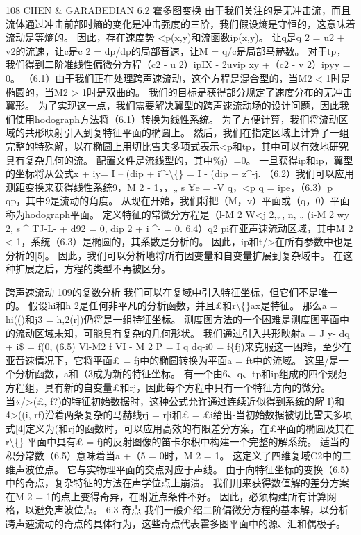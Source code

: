 \documentclass[UTF8,11pt,a4paper,openany,fontset=fandol]{ctexbook}
\begin{document}
108 CHEN \& GARABEDIAN 6.2 霍多图变换 由于我们关注的是无冲击流，而且流体通过冲击前部时熵的变化是冲击强度的三阶，我们假设熵是守恒的，这意味着流动是等熵的。 因此，存在速度势 <p(x,y)和流函数ip(x,y)。 让q是q 2 = u2 + v2的流速，让c是c 2 = dp/dp的局部音速，让M = q/c是局部马赫数。 对于tp，我们得到二阶准线性偏微分方程（c2 - u 2）ipIX - 2uvip xy +（c2 - v 2）ipyy = 0。 （6.1）由于我们正在处理跨声速流动，这个方程是混合型的，当M2 < 1时是椭圆的，当M2 > 1时是双曲的。 我们的目标是获得部分规定了速度分布的无冲击翼形。 为了实现这一点，我们需要解决翼型的跨声速流动场的设计问题，因此我们使用hodograph方法将（6.1）转换为线性系统。 为了方便计算，我们将流动区域的共形映射引入到复特征平面的椭圆上。 然后，我们在指定区域上计算了一组完整的特殊解，以在椭圆上用切比雪夫多项式表示<p和tp，其中可以有效地研究具有复杂几何的流。 配置文件是流线型的，其中\%j）=0。 一旦获得ip和ip，翼型的坐标将从公式x + iy= I -- (dip + i\textasciicircum{}-\textbackslash\{\} = I - (dip + z\textasciicircum{}-j. （6.2）我们可以应用测距变换来获得线性系统9，M 2 - 1，，„ s ¥e = -V q，<p q = ipe，（6.3）p qp，其中9是流动的角度。 从现在开始，我们将把（M，v）平面或（q，0）平面称为hodograph平面。 定义特征的常微分方程是（l-M 2 W<j 2,„, n, „ (i-M 2 wy 2, s \textasciicircum{} TJ-L- + d92 = 0, dip 2 + i \textasciicircum{}- = 0. 6.4）q2 pi在亚声速流动区域，其中M 2 < 1，系统（6.3）是椭圆的，其系数是分析的。 因此，ip和t/>在所有参数中也是分析的[5]。 因此，我们可以分析地将所有因变量和自变量扩展到复杂域中。 在这种扩展之后，方程的类型不再被区分。

跨声速流动 109的复数分析 我们可以在复域中引入特征坐标，但它们不是唯一的。 假设hi和h 2是任何非平凡的分析函数，并且£和r\textbackslash\{\}ax是特征。 那么a = hi(()和j3 = h,2(r])仍将是一组特征坐标。 测度图方法的一个困难是测度图平面中的流动区域未知，可能具有复杂的几何形状。 我们通过引入共形映射a = J y- dq + i\$ = f(0, (6.5) Vl-M2 f VI - M 2 P = I q dq-i0 = f\{fj)来克服这一困难，至少在亚音速情况下，它将平面£ = fj中的椭圆转换为平面a = ft中的流域。 这里/是一个分析函数，a和（3成为新的特征坐标。 有一个由6、q、tp和ip组成的四个规范方程组，具有新的自变量£和rj，因此每个方程中只有一个特征方向的微分。 当«/>(£, f?)的特征初始数据时，这种公式允许通过连续近似得到系统的解 I)和4>((i, rf)沿着两条复杂的马赫线rj = r]i和£ = £i给出-当初始数据被切比雪夫多项式[4]定义为(和rj的函数时，可以应用高效的有限差分方案，在£平面的椭圆及其在r\textbackslash\{\}-平面中具有£ = fj的反射图像的笛卡尔积中构建一个完整的解系统。 适当的积分常数（6.5）意味着当a +（5 = 0时，M 2 = 1。 这定义了四维复域C2中的二维声波位点。 它与实物理平面的交点对应于声线。 由于向特征坐标的变换（6.5）中的奇点，复杂特征的方法在声学位点上崩溃。 我们用来获得数值解的差分方案在M 2 = 1的点上变得奇异，在附近点条件不好。 因此，必须构建所有计算网格，以避免声波位点。 6.3 奇点 我们一般介绍二阶偏微分方程的基本解，以分析跨声速流动的奇点的具体行为，这些奇点代表霍多图平面中的源、汇和偶极子。
\end{document}
